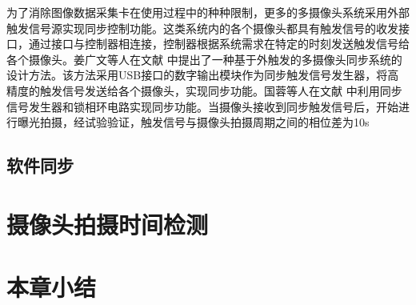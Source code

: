 为了消除图像数据采集卡在使用过程中的种种限制，更多的多摄像头系统采用外部触发信号源实现同步控制功能。这类系统内的各个摄像头都具有触发信号的收发接口，通过接口与控制器相连接，控制器根据系统需求在特定的时刻发送触发信号给各个摄像头。姜广文等人在文献 \cite{姜广文} 中提出了一种基于外触发的多摄像头同步系统的设计方法。该方法采用USB接口的数字输出模块作为同步触发信号发生器，将高精度的触发信号发送给各个摄像头，实现同步功能。国蓉等人在文献 \cite{国蓉2014具有} 中利用同步信号发生器和锁相环电路实现同步功能。当摄像头接收到同步触发信号后，开始进行曝光拍摄，经试验验证，触发信号与摄像头拍摄周期之间的相位差为10\textmu s

\subsection{软件同步}


\section{摄像头拍摄时间检测}



\section{本章小结}










































